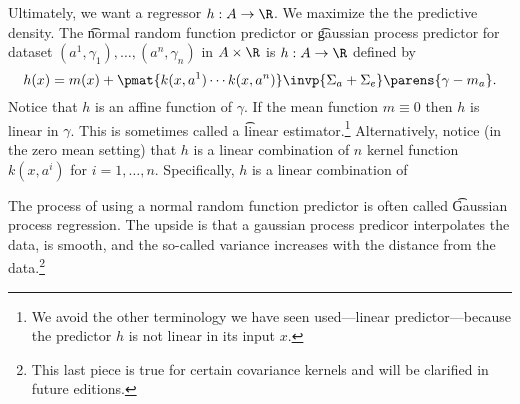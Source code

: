 
Ultimately, we want a regressor $h: A \to \R$.
We maximize the the predictive density.
The \t{normal random function predictor} or \t{gaussian process predictor} for dataset $(a^1, \gamma_1), \dots, (a^n, \gamma_n)$ in $A \times \R$ is $h: A \to \R$ defined by
\[
  h(x) = m(x) + \pmat{k(x,a^1) \cdots k(x, a^n)}\invp{\Sigma_{a} + \Sigma_{e}}\parens{\gamma - m_{a}}.
\]
Notice that $h$ is an affine function of $\gamma$.
If the mean function $m \equiv 0$ then $h$ is linear in $\gamma$.
This is sometimes called a \t{linear estimator}.\footnote{We avoid the other terminology we have seen used---linear predictor---because the predictor $h$ is not linear in its input $x$.}
Alternatively, notice (in the zero mean setting) that $h$ is a linear combination of $n$ kernel function $k(x, a^i)$ for $i = 1, \dots, n$.
Specifically, $h$ is a linear combination of

The process of using a normal random function predictor is often called \t{Gaussian process regression}.
The upside is that a gaussian process predicor interpolates the data, is smooth, and the so-called variance increases with the distance from the data.\footnote{This last piece is true for certain covariance kernels and will be clarified in future editions.}
